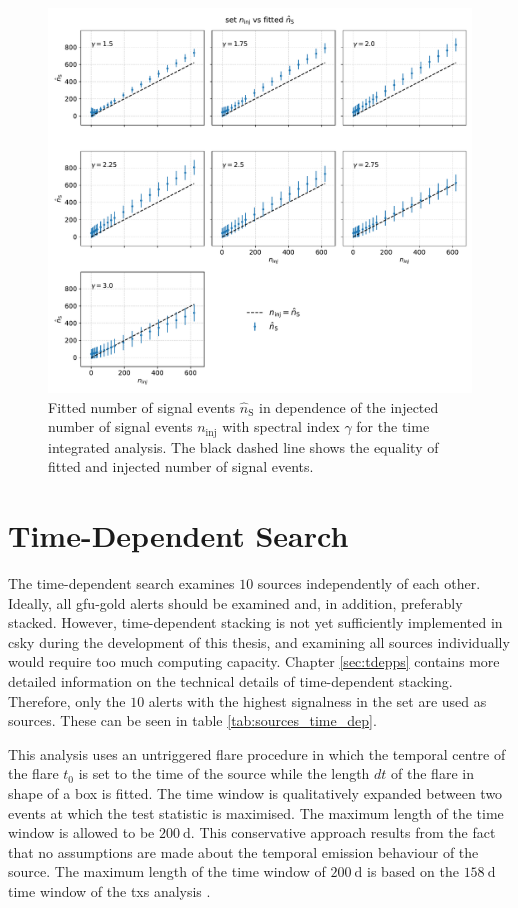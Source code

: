 \begin{figure}
    \centering
    \includegraphics[width=\linewidth]{Plots/05_csky/ns_fit_auto_4.pdf}
    \caption{Fitted number of signal events $\hat{n}_{\text{S}}$ in dependence of the injected number of signal events $n_\text{inj}$ with spectral index $\gamma$ for the time integrated analysis. The black dashed line shows the equality of fitted and injected number of signal events.}
    \label{fig:fit_bias_ns}
\end{figure}

\chapter{Time-Dependent Search} \label{sec:csky_time_dep}

The time-dependent search examines $\num{10}$ sources independently of each other.
Ideally, all gfu-gold alerts should be examined and, in addition, preferably stacked.
However, time-dependent stacking is not yet sufficiently implemented in csky during the development of this thesis, and examining all sources individually would require too much computing capacity.
Chapter \ref{sec:tdepps} contains more detailed information on the technical details of time-dependent stacking.
Therefore, only the $\num{10}$ alerts with the highest signalness in the set are used as sources.
These can be seen in table \ref{tab:sources_time_dep}.

This analysis uses an untriggered flare procedure in which the temporal centre of the flare $t_0$ is set to the time of the source while the length $dt$ of the flare in shape of a box is fitted.
The time window is qualitatively expanded between two events at which the test statistic is maximised.
The maximum length of the time window is allowed to be $\SI{200}{\day}$.
This conservative approach results from the fact that no assumptions are made about the temporal emission behaviour of the source.
The maximum length of the time window of $\SI{200}{\day}$ is based on the $\SI{158}{\day}$ time window of the txs analysis \cite{txs}.

